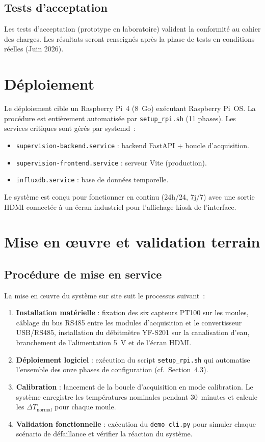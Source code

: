 \subsection{Tests d'acceptation}

Les tests d'acceptation (prototype en laboratoire) valident la conformité au cahier des charges. Les résultats seront renseignés après la phase de tests en conditions réelles (Juin 2026).

\section{Déploiement}

Le déploiement cible un Raspberry Pi~4 (8~Go) exécutant Raspberry Pi~OS. La procédure est entièrement automatisée par \texttt{setup\_rpi.sh} (11 phases). Les services critiques sont gérés par systemd~:

\begin{itemize}
  \item \texttt{supervision-backend.service} : backend FastAPI + boucle d'acquisition.
  \item \texttt{supervision-frontend.service} : serveur Vite (production).
  \item \texttt{influxdb.service} : base de données temporelle.
\end{itemize}

Le système est conçu pour fonctionner en continu (24h/24, 7j/7) avec une sortie HDMI connectée à un écran industriel pour l'affichage kiosk de l'interface.

\section{Mise en œuvre et validation terrain}

\subsection{Procédure de mise en service}

La mise en œuvre du système sur site suit le processus suivant~:

\begin{enumerate}
  \item \textbf{Installation matérielle} : fixation des six capteurs PT100 sur les moules, câblage du bus RS485 entre les modules d'acquisition et le convertisseur USB/RS485, installation du débitmètre YF-S201 sur la canalisation d'eau, branchement de l'alimentation 5~V et de l'écran HDMI.
  \item \textbf{Déploiement logiciel} : exécution du script \texttt{setup\_rpi.sh} qui automatise l'ensemble des onze phases de configuration (cf.~Section~4.3).
  \item \textbf{Calibration} : lancement de la boucle d'acquisition en mode calibration. Le système enregistre les températures nominales pendant 30~minutes et calcule les \(\Delta T_{\text{normal}}\) pour chaque moule.
  \item \textbf{Validation fonctionnelle} : exécution du \texttt{demo\_cli.py} pour simuler chaque scénario de défaillance et vérifier la réaction du système.
\end{enumerate}

